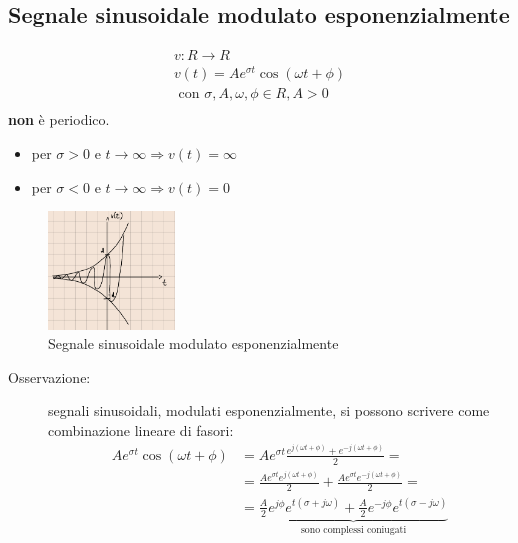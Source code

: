 \documentclass[a4paper, 12pt]{book}
\theoremstyle{plain}
\begin{document}
\subsection{Segnale sinusoidale modulato esponenzialmente}

\begin{gather}
    v : R \rightarrow R\\
    v(t) = A e^{\sigma t} \cos (\omega t + \phi)\\
    \textrm{ con } \sigma, A, \omega, \phi \in R, A > 0\\
\end{gather}
 \textbf{non} è periodico.   

\begin{itemize}
    \item per $\sigma > 0$ e $t \rightarrow \infty \Rightarrow v(t) = \infty$
    \item per $\sigma < 0$ e $t \rightarrow \infty \Rightarrow v(t) = 0$
\end{itemize}

\begin{figure}
    \includegraphics[width=0.3\textwidth]{nomelunghissimo.png}
    \caption{Segnale sinusoidale modulato esponenzialmente}
\end{figure}

\begin{description}
    \item[Osservazione: ] segnali sinusoidali, modulati esponenzialmente, si possono scrivere come combinazione lineare di fasori: \[
        \begin{split}
            A e^{\sigma t} \cos (\omega t + \phi) &= A e^{\sigma t} \frac{e^{j(\omega t + \phi)} + e^{-j(\omega t + \phi)}}{2} = \\
            &= \frac{A e^{\sigma t} e^{j(\omega t + \phi)}}{2} + \frac{A e^{\sigma t} e^{-j(\omega t + \phi)}}{2} = \\
            &= \underbrace{\frac{A}{2} e^{j\phi} e^{t(\sigma + j\omega)} + \frac{A}{2} e^{-j\phi} e^{t(\sigma - j\omega)}}_{\textrm{sono complessi coniugati}}
        \end{split}
         \] 
\end{description}
\end{document}
